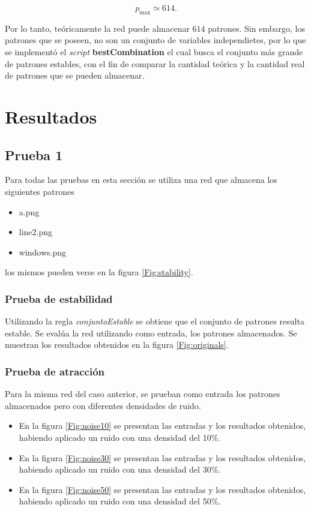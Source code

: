 \documentclass{article}
\begin{document}
\begin{equation}
 p_{\mbox{max}} \simeq 614.
\end{equation}

Por lo tanto, teóricamente la red puede almacenar $614$ patrones. Sin embargo, los patrones que se poseen, no son un conjunto
de variables independietes, por lo que se implementó el \emph{script} \textbf{bestCombination} el cual busca el conjunto
más grande de patrones estables, con el fin de comparar la cantidad teórica y la cantidad real de patrones que se pueden
almacenar.

\section{Resultados}

\subsection{Prueba 1}

Para todas las pruebas en esta sección se utiliza una red que almacena los siguientes patrones

\begin{itemize}
 \item a.png
 \item line2.png
 \item windows.png
\end{itemize}
los mismos pueden verse en la figura \ref{Fig:stability}.

\subsubsection{Prueba de estabilidad}
Utilizando la regla \emph{conjuntoEstable} se obtiene que el conjunto de patrones resulta estable. Se evalúa
la red utilizando como entrada, los patrones almacenados. Se muestran los resultados obtenidos en la figura \ref{Fig:originals}.


\subsubsection{Prueba de atracción}
Para la misma red del caso anterior, se prueban como entrada los patrones almacenados pero con diferentes densidades
de ruido.

\begin{itemize}
 \item En la figura \ref{Fig:noise10} se presentan las entradas y los resultados obtenidos, habiendo aplicado un ruido con una densidad del 10\%.
 \item En la figura \ref{Fig:noise30} se presentan las entradas y los resultados obtenidos, habiendo aplicado un ruido con una densidad del 30\%.
 \item En la figura \ref{Fig:noise50} se presentan las entradas y los resultados obtenidos, habiendo aplicado un ruido con una densidad del 50\%.
\end{itemize}
\end{document}
